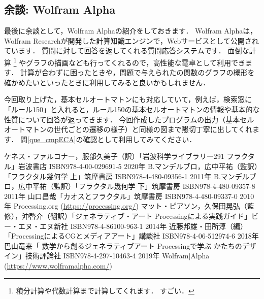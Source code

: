 \documentclass[dvipdfmx]{jsarticle}
\theoremstyle{definition}
\begin{document}
\subsection{余談: Wolfram Alpha}

最後に余談として，Wolfram Alpha\cite{wolalp}の紹介をしておきます．
Wolfram Alphaは，Wolfram Researchが開発した計算知識エンジンで，Webサービスとして公開されています．
質問に対して回答を返してくれる質問応答システムです．
面倒な計算
\footnote{
    積分計算や代数計算まで計算してくれます．
    すごい．
}
やグラフの描画なども行ってくれるので，高性能な電卓として利用できます．
計算が合わずに困ったときや，問題で与えられたの関数のグラフの概形を確かめたいといったときに利用してみると良いかもしれません．

今回取り上げた，基本セルオートマトンにも対応していて，例えば，検索窓に「ルール150」と入れると，ルール150の基本セルオートマトンの情報や基本的な性質について回答が返ってきます．
今回作成したプログラムの出力（基本セルオートマトンの世代ごとの遷移の様子）と同様の図まで懇切丁寧に出してくれます．
問\ref{que_cmpECA}の確認として利用してみてください．



\begin{thebibliography}{9}
     ケネス・ファルコナー，服部久美子（訳）「岩波科学ライブラリー291 フラクタル」岩波書店 ISBN978-4-00-029691-5 2020年
     B.マンデルブロ，広中平祐（監訳）「フラクタル幾何学 上」筑摩書房 ISBN978-4-480-09356-1 2011年
     B.マンデルブロ，広中平祐（監訳）「フラクタル幾何学 下」筑摩書房 ISBN978-4-480-09357-8 2011年
     山口昌哉「カオスとフラクタル」筑摩書房 ISBN978-4-480-09337-0 2010年
     Processing.org (\url{https://processing.org/})
     マット・ピアソン，久保田晃弘（監修），沖啓介（翻訳）「ジェネラティブ・アート Processingによる実践ガイド」ビー・エヌ・エヌ新社 ISBN978-4-86100-963-1 2014年
     近藤邦雄・田所淳（編）「ProcessingによるCGとメディアアート」講談社 ISBN978-4-06-512974-6 2018年
     巴山竜来「 数学から創るジェネラティブアート Processingで学ぶ かたちのデザイン」技術評論社 ISBN978-4-297-10463-4 2019年
     Wolfram$|$Alpha (\url{https://www.wolframalpha.com/})
\end{thebibliography}



\newpage{}
\end{document}
